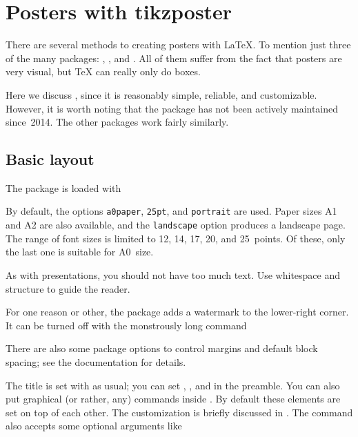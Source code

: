 \chapter{Posters with tikzposter}

There are several methods to creating posters with \LaTeX{}.
To mention just three of the many packages: , , and .
All of them suffer from the fact that posters are very visual,
but \TeX{} can really only do boxes.

Here we discuss , since it is reasonably simple, reliable, and customizable.
However, it is worth noting that the package has not been actively maintained since~2014.
The other packages work fairly similarly.


%
%
\section{Basic layout}

The package is loaded with
%
%
By default, the options \verb|a0paper|, \verb|25pt|, and \verb|portrait| are used.
Paper sizes A1 and A2 are also available, and the \verb|landscape| option produces a landscape page.
The range of font sizes is limited to 12, 14, 17, 20, and 25~points.
Of these, only the last one is suitable for A0~size.

\begin{practices}
As with presentations, you should not have too much text.
Use whitespace and structure to guide the reader.
\end{practices}

For one reason or other, the package adds a watermark to the lower-right corner.
It can be turned off with the monstrously long command
%
\begin{ExampleCode}
\tikzposterlatexaffectionproofoff
\end{ExampleCode}
%
There are also some package options to control margins and default block spacing;
see the documentation for details.

The title is set with  as usual;
you can set , , and  in the preamble.
You can also put graphical (or rather, any) commands inside .
By default these elements are set on top of each other.
The customization is briefly discussed in .
The  command also accepts some optional arguments like
%
\begin{ExampleCode}
\maketitle[width=40cm]
\end{ExampleCode}



